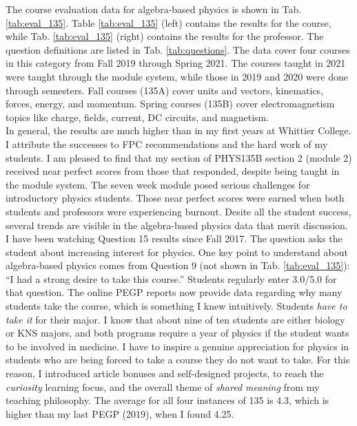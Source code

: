 \documentclass[../../main.tex]{subfiles}
\begin{document}
The course evaluation data for algebra-based physics is shown in Tab. \ref{tab:eval_135}.  Table \ref{tab:eval_135} (left) contains the results for the course, while Tab. \ref{tab:eval_135} (right) contains the results for the professor.  The question definitions are listed in Tab. \ref{tab:questions}.  The data cover four courses in this category from Fall 2019 through Spring 2021.  The courses taught in 2021 were taught through the module system, while those in 2019 and 2020 were done through semesters.  Fall courses (135A) cover units and vectors, kinematics, forces, energy, and momentum.  Spring courses (135B) cover electromagnetism topics like charge, fields, current, DC circuits, and magnetism.
\\
\vspace{0.25cm}
In general, the results are much higher than in my first years at Whittier College.  I attribute the successes to FPC recommendations and the hard work of my students.  I am pleased to find that my section of PHYS135B section 2 (module 2) received near perfect scores from those that responded, despite being taught in the module system.  The seven week module posed serious challenges for introductory physics students.  Those near perfect scores were earned when both students and professors were experiencing burnout.  Desite all the student success, several trends are visible in the algebra-based physics data that merit discussion.
\\
\vspace{0.25cm}
I have been watching Question 15 results since Fall 2017.  The question asks the student about increasing interest for physics.  One key point to understand about algebra-based physics comes from Question 9 (not shown in Tab. \ref{tab:eval_135}): ``I had a strong desire to take this course.''  Students regularly enter 3.0/5.0 for that question.  The online PEGP reports now provide data regarding why many students take the course, which is something I knew intuitively.  Students \textit{have to take it} for their major.  I know that about nine of ten students are either biology or KNS majors, and both programs require a year of physics if the student wants to be involved in medicine.  I have to inspire a genuine appreciation for physics in students who are being forced to take a course they do not want to take.  For this reason, I introduced article bonuses and self-designed projects, to reach the \textit{curiosity} learning focus, and the overall theme of \textit{shared meaning} from my teaching philosophy.  The average for all four instances of 135 is 4.3, which is higher than my last PEGP (2019), when I found 4.25.
\end{document}

